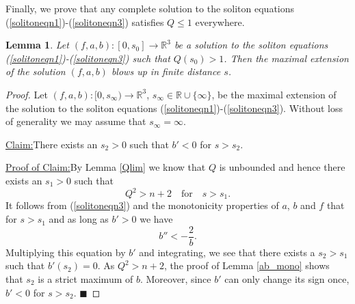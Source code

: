 \documentclass{amsart}
\newtheorem{lem}[thm]{Lemma}
\theoremstyle{definition}
\theoremstyle{remark}
\numberwithin{equation}{section}
\newcommand{\R}{\mathbb{R}}  %
\newenvironment{claim}[1]{\par\noindent\underline{Claim:}\space#1}{}
\newenvironment{claimproof}[1]{\par\noindent\underline{Proof of Claim:}\space#1}{\hfill $\blacksquare$}
\begin{document}
Finally, we prove that any complete solution to the soliton equations (\ref{solitoneqn1})-(\ref{solitoneqn3}) satisfies $Q \leq 1$ everywhere.
\begin{lem}
Let $(f,a,b): [0,s_0] \rightarrow \R^3$ be a solution to the soliton equations (\ref{solitoneqn1})-(\ref{solitoneqn3}) such that $Q(s_0) > 1$. Then the maximal extension of the solution $(f,a,b)$ blows up in finite distance $s$.
\end{lem}
\begin{proof}
Let $(f, a, b): [0, s_\infty) \rightarrow \R^3$, $s_\infty \in \R \cup \{ \infty\}$, be the maximal extension of the solution to the soliton equations (\ref{solitoneqn1})-(\ref{solitoneqn3}). Without loss of generality we may assume that $s_\infty = \infty$.

\vspace{1em}
\begin{claim}
There exists an $s_2 > 0$ such that $b' < 0$ for $s > s_2$.
\end{claim}
\vspace{0.5em}
\begin{claimproof}
By Lemma \ref{Qlim} we know that $Q$ is unbounded and hence there exists an $s_1>0$ such that
$$ Q^2 > n+ 2 \quad \text{for} \quad s > s_1.$$
It follows from (\ref{solitoneqn3}) and the monotonicity properties of $a$, $b$ and $f$ that for $s>s_1$ and as long as $b'>0$ we have
\begin{equation*}
b'' < - \frac{2}{b}.
\end{equation*}
Multiplying this equation by $b'$ and integrating, we see that there exists a $s_2 > s_1$ such that $b'(s_2) = 0$. As $Q^2 > n+2$, the proof of Lemma \ref{ab_mono} shows that $s_2$ is a strict maximum of $b$. Moreover, since $b'$ can only change its sign once, $b' < 0$ for $s > s_2$.
\end{claimproof}


\end{proof}
\end{document}
